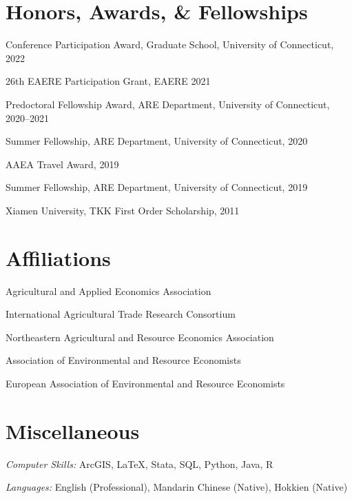 \documentclass[10.5pt,letterpaper]{article}
\renewenvironment{itemize}{
	\begin{list}{}{
			\setlength{\leftmargin}{1.5em}
		}
	}{
	\end{list}
}
\begin{document}
	\section*{\textbf{Honors, Awards, \& Fellowships}}
	\begin{itemize}
		\item[-] Conference Participation Award, Graduate School, University of Connecticut, 2022
		\item[-] 26th EAERE Participation Grant, EAERE 2021
		\item[-] Predoctoral Fellowship Award, ARE Department, University of Connecticut, 2020–2021
		\item[-] Summer Fellowship, ARE Department, University of Connecticut, 2020
		\item[-] AAEA Travel Award, 2019
		\item[-] Summer Fellowship, ARE Department, University of Connecticut, 2019
		\item[-] Xiamen University, TKK First Order Scholarship, 2011
	\end{itemize}
	
	\section*{\textbf{Affiliations}}
	\begin{itemize}
		\item[-] Agricultural and Applied Economics Association
		\item[-] International Agricultural Trade Research Consortium
		\item[-] Northeastern Agricultural and Resource Economics Association
		\item[-] Association of Environmental and Resource Economists
		\item[-] European Association of Environmental and Resource Economists
	\end{itemize}
	
	\section*{\textbf{Miscellaneous}}
	\begin{itemize}
		\item[-] \textit{Computer Skills:} ArcGIS, \LaTeX, Stata, SQL, Python, Java, R
		\item[-] \textit{Languages:} English (Professional), Mandarin Chinese (Native), Hokkien (Native)
	\end{itemize}
	
\end{document}
